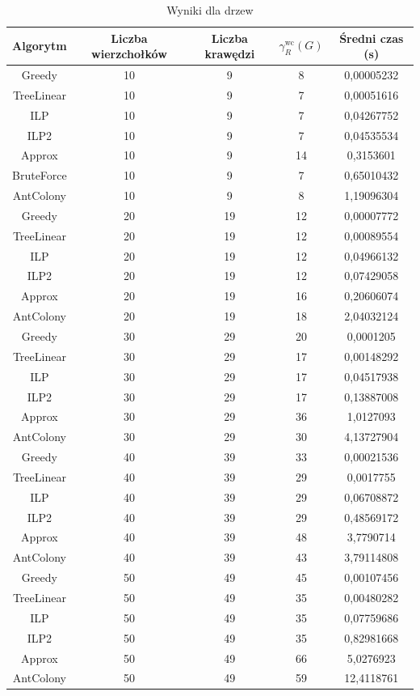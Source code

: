 \begin{table}[H]
    \centering
    \begin{tabular}{|c|c|c|c|c|}
    \hline
    Algorytm & Liczba wierzchołków & Liczba krawędzi & $\gamma^{\text{wc}}_R(G)$ & Średni czas (s) \\
    \hline
    Greedy & 10 & 9 & 8 & 0,00005232 \\
    TreeLinear & 10 & 9 & 7 & 0,00051616 \\
    ILP & 10 & 9 & 7 & 0,04267752 \\
    ILP2 & 10 & 9 & 7 & 0,04535534 \\
    Approx & 10 & 9 & 14 & 0,3153601 \\
    BruteForce & 10 & 9 & 7 & 0,65010432 \\
    AntColony & 10 & 9 & 8 & 1,19096304 \\
    \hline
    Greedy & 20 & 19 & 12 & 0,00007772 \\
    TreeLinear & 20 & 19 & 12 & 0,00089554 \\
    ILP & 20 & 19 & 12 & 0,04966132 \\
    ILP2 & 20 & 19 & 12 & 0,07429058 \\
    Approx & 20 & 19 & 16 & 0,20606074 \\
    AntColony & 20 & 19 & 18 & 2,04032124 \\
    \hline
    Greedy & 30 & 29 & 20 & 0,0001205 \\
    TreeLinear & 30 & 29 & 17 & 0,00148292 \\
    ILP & 30 & 29 & 17 & 0,04517938 \\
    ILP2 & 30 & 29 & 17 & 0,13887008 \\
    Approx & 30 & 29 & 36 & 1,0127093 \\
    AntColony & 30 & 29 & 30 & 4,13727904 \\
     \hline
     Greedy & 40 & 39 & 33 & 0,00021536 \\
     TreeLinear & 40 & 39 & 29 & 0,0017755 \\
     ILP & 40 & 39 & 29 & 0,06708872 \\
     ILP2 & 40 & 39 & 29 & 0,48569172 \\
     Approx & 40 & 39 & 48 & 3,7790714 \\
     AntColony & 40 & 39 & 43 & 3,79114808 \\
    \hline
    Greedy & 50 & 49 & 45 & 0,00107456 \\
    TreeLinear & 50 & 49 & 35 & 0,00480282 \\
    ILP & 50 & 49 & 35 & 0,07759686 \\
    ILP2 & 50 & 49 & 35 & 0,82981668 \\
    Approx & 50 & 49 & 66 & 5,0276923 \\
    AntColony & 50 & 49 & 59 & 12,4118761 \\ 
    \hline
    \end{tabular}
    \caption{Wyniki dla drzew}
    \end{table}

